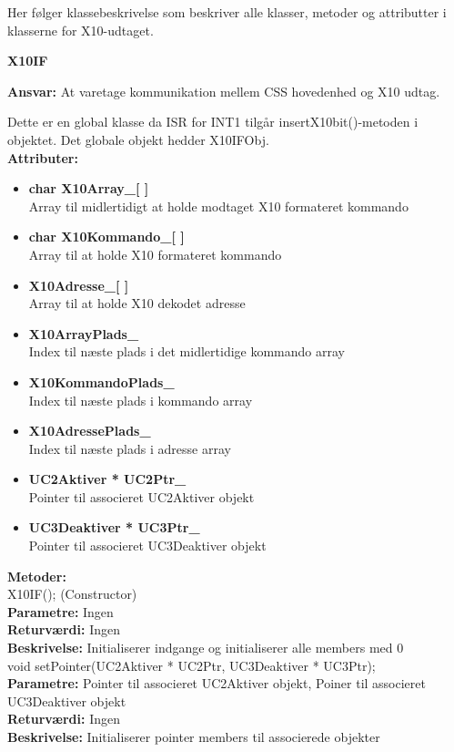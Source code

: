 Her følger klassebeskrivelse som beskriver alle klasser, metoder og attributter i klasserne for X10-udtaget.

%
%
{\centering
\textbf{X10IF}\par
}
\textbf{Ansvar:} At varetage kommunikation mellem CSS hovedenhed og X10 udtag.

Dette er en global klasse da ISR for INT1 tilgår insertX10bit()-metoden i objektet. Det globale objekt hedder X10IFObj. \\
\textbf{Attributer:}
\begin{itemize}
	\item \textbf{char X10Array\_[ ]} \\
	Array til midlertidigt at holde modtaget X10 formateret kommando
	\item \textbf{char X10Kommando\_[ ]} \\
	Array til at holde X10 formateret kommando	
	\item \textbf{X10Adresse\_[ ]} \\
	Array til at holde X10 dekodet adresse
	\item \textbf{X10ArrayPlads\_} \\
	Index til næste plads i det midlertidige kommando array
	\item \textbf{X10KommandoPlads\_} \\
	Index til næste plads i kommando array
	\item \textbf{X10AdressePlads\_} \\
	Index til næste plads i adresse array
	\item \textbf{UC2Aktiver * UC2Ptr\_} \\
	Pointer til associeret UC2Aktiver objekt
	\item \textbf{UC3Deaktiver * UC3Ptr\_} \\
	Pointer til associeret UC3Deaktiver objekt
\end{itemize}
\textbf{Metoder:} \\
X10IF(); (Constructor) \\
\textbf{Parametre:} Ingen \\
\textbf{Returværdi:} Ingen \\
\textbf{Beskrivelse:} Initialiserer indgange og initialiserer alle members med 0 \\

void setPointer(UC2Aktiver * UC2Ptr, UC3Deaktiver * UC3Ptr); \\
\textbf{Parametre:} Pointer til associeret UC2Aktiver objekt, Poiner til associeret UC3Deaktiver objekt \\
\textbf{Returværdi:} Ingen \\
\textbf{Beskrivelse:} Initialiserer pointer members til associerede objekter \\

